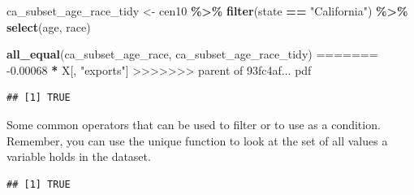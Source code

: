 \documentclass[]{book}
\newenvironment{Shaded}{\begin{snugshade}}{\end{snugshade}}
\newcommand{\CommentTok}[1]{\textcolor[rgb]{0.56,0.35,0.01}{\textit{#1}}}
\newcommand{\DecValTok}[1]{\textcolor[rgb]{0.00,0.00,0.81}{#1}}
\newcommand{\FloatTok}[1]{\textcolor[rgb]{0.00,0.00,0.81}{#1}}
\newcommand{\KeywordTok}[1]{\textcolor[rgb]{0.13,0.29,0.53}{\textbf{#1}}}
\newcommand{\NormalTok}[1]{#1}
\newcommand{\OperatorTok}[1]{\textcolor[rgb]{0.81,0.36,0.00}{\textbf{#1}}}
\newcommand{\StringTok}[1]{\textcolor[rgb]{0.31,0.60,0.02}{#1}}
\theoremstyle{definition}
\theoremstyle{definition}
\theoremstyle{definition}
\theoremstyle{remark}
\begin{document}
\begin{Shaded}
\begin{Highlighting}[]
\begin{Shaded}
\begin{Highlighting}[]
\begin{Shaded}
\begin{Highlighting}[]
\NormalTok{ca\_subset\_age\_race\_tidy <{-}}\StringTok{ }\NormalTok{cen10 }\OperatorTok{\%>\%}\StringTok{ }\KeywordTok{filter}\NormalTok{(state }\OperatorTok{==}\StringTok{ "California"}\NormalTok{) }\OperatorTok{\%>\%}\StringTok{ }\KeywordTok{select}\NormalTok{(age, race)}

\KeywordTok{all\_equal}\NormalTok{(ca\_subset\_age\_race, ca\_subset\_age\_race\_tidy)}
=======
\FloatTok{-0.00068} \OperatorTok{*}\StringTok{ }\NormalTok{X[, }\StringTok{"exports"}\NormalTok{]}
>>>>>>> parent of 93fc4af... pdf
\end{Highlighting}
\end{Shaded}

\begin{verbatim}
## [1] TRUE
\end{verbatim}

Some common operators that can be used to filter or to use as a condition. Remember, you can use the unique function to look at the set of all values a variable holds in the dataset.

\begin{Shaded}
\end{Shaded}

\begin{verbatim}
## [1] TRUE
\end{verbatim}


\end{Highlighting}
\end{Shaded}
\end{Highlighting}
\end{Shaded}
\end{document}
